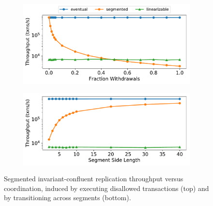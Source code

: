\begin{figure}[ht]
  \centering

  \begin{subfigure}[c]{\columnwidth}
    \centering
    \includegraphics[width=\columnwidth]{figures/vary_withdraws.pdf}
  \end{subfigure}
  \begin{subfigure}[c]{\columnwidth}
    \includegraphics[width=\columnwidth]{figures/vary_segments.pdf}
  \end{subfigure}

  \caption{%
    Segmented invariant-confluent replication throughput versus coordination,
    induced by executing disallowed transactions (top) and by transitioning
    across segments (bottom).
  }
\end{figure}

